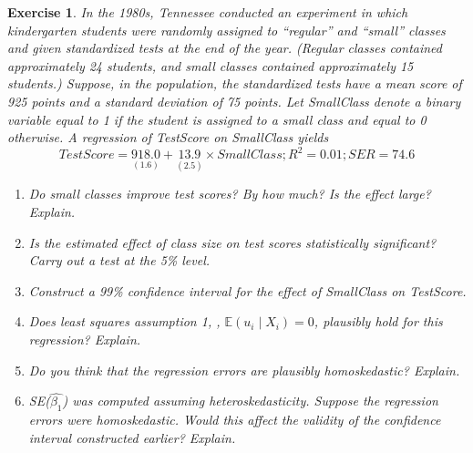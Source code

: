 \documentclass{article}
\newtheorem{exercise}[theorem]{Exercise}
\begin{document}
\begin{exercise} %
    In the 1980s, Tennessee conducted an experiment in which kindergarten students were randomly assigned to “regular” and “small” classes and given standardized tests at the end of the year. (Regular classes contained approximately 24 students, and small classes contained approximately 15 students.) Suppose, in the population, the standardized tests have a mean score of 925 points and a standard deviation of 75 points. Let \textit{SmallClass} denote a binary variable equal to 1 if the student is assigned to a small class and equal to 0 otherwise. A regression of \textit{TestScore} on \textit{SmallClass} yields
    \begin{equation*}
        TestScore = \underset{(1.6)}{918.0} + \underset{(2.5)}{13.9} \times SmallClass; R^2 = 0.01; SER = 74.6
    \end{equation*}
    \begin{enumerate}[label=(\alph*)]
        \item Do small classes improve test scores? By how much? Is the effect large? Explain.
        \item Is the estimated effect of class size on test scores statistically significant? Carry out a test at the 5\% level.
        \item Construct a 99\% confidence interval for the effect of SmallClass on TestScore.
        \item Does least squares assumption 1, , $\mathbb{E}(u_i\mid X_i)=0$, plausibly hold for this regression? Explain.
        \item Do you think that the regression errors are plausibly homoskedastic? Explain.
        \item SE($\hat{\beta_1}$) was computed assuming heteroskedasticity. Suppose the regression errors were homoskedastic. Would this affect the validity of the confidence interval constructed earlier? Explain.
    \end{enumerate}
\end{exercise}
\end{document}
